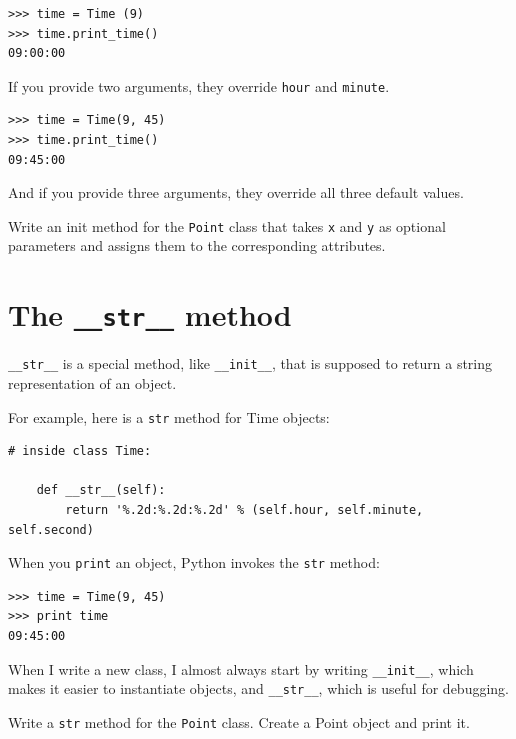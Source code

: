 \documentclass[10pt]{book}
\begin{document}
\begin{verbatim}
>>> time = Time (9)
>>> time.print_time()
09:00:00
\end{verbatim}
%
If you provide two arguments, they override {\tt hour} and
{\tt minute}.

\begin{verbatim}
>>> time = Time(9, 45)
>>> time.print_time()
09:45:00
\end{verbatim}
%
And if you provide three arguments, they override all three
default values.


\begin{exercise}

Write an init method for the {\tt Point} class that takes
{\tt x} and {\tt y} as optional parameters and assigns
them to the corresponding attributes.
\end{exercise}


\section{The {\tt \_\_str\_\_} method}

\verb"__str__" is a special method, like \verb"__init__",
that is supposed to return a string representation of an object.

For example, here is a {\tt str} method for Time objects:

\begin{verbatim}
# inside class Time:

    def __str__(self):
        return '%.2d:%.2d:%.2d' % (self.hour, self.minute, self.second)
\end{verbatim}
%
When you {\tt print} an object, Python invokes the {\tt str} method:

\begin{verbatim}
>>> time = Time(9, 45)
>>> print time
09:45:00
\end{verbatim}
%
When I write a new class, I almost always start by writing 
\verb"__init__", which makes it easier to instantiate objects, and 
\verb"__str__", which is useful for debugging.


\begin{exercise}

Write a {\tt str} method for the {\tt Point} class.  Create
a Point object and print it.

\end{exercise}
\end{document}
